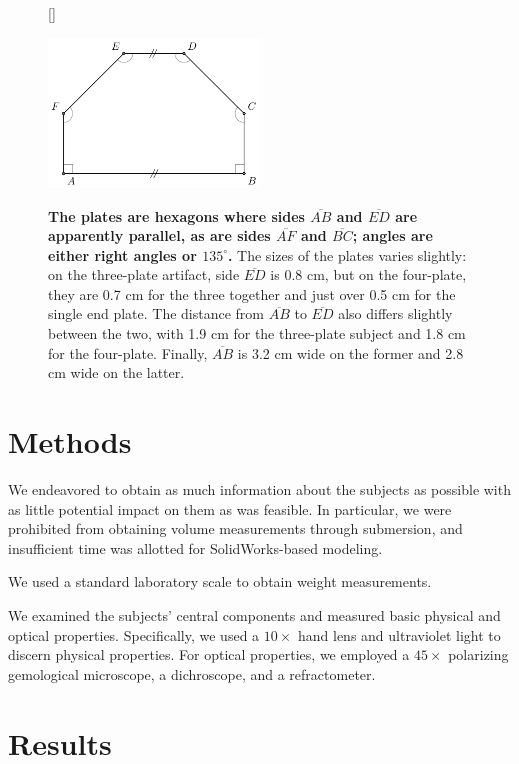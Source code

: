 \documentclass[10pt,twoside,openany]{article}
\theoremstyle{definition}
\begin{document}
\begin{figure}
[\FBwidth]
{\caption{\label{fig:plate}\textbf{The plates are hexagons where sides $\overline{AB}$ and $\overline{ED}$ are apparently parallel, as are sides $\overline{AF}$ and $\overline{BC}$; angles are either right angles or $135^\circ$.} The sizes of the plates varies slightly: on the three-plate artifact, side $\overline{ED}$ is 0.8 cm, but on the four-plate, they are 0.7 cm for the three together and just over 0.5 cm for the single end plate. The distance from $\overline{AB}$ to $\overline{ED}$ also differs slightly between the two, with 1.9 cm for the three-plate subject and 1.8 cm for the four-plate. Finally, $\overline{AB}$ is 3.2 cm wide on the former and 2.8 cm wide on the latter.}}
{\includegraphics[width=0.5\textwidth]{plate.pdf}}
\end{figure}

\section{Methods}
We endeavored to obtain as much information about the subjects as possible with as little potential impact on them as was feasible.
In particular, we were prohibited from obtaining volume measurements through submersion, and insufficient time was allotted for SolidWorks-based modeling.

We used a standard laboratory scale to obtain weight measurements.

We examined the subjects' central components and measured basic physical and optical properties.
Specifically, we used a $10\times$ hand lens and ultraviolet light to discern physical properties.
For optical properties, we employed a $45\times$ polarizing gemological microscope, a dichroscope, and a refractometer.

\section{Results}
\end{document}
